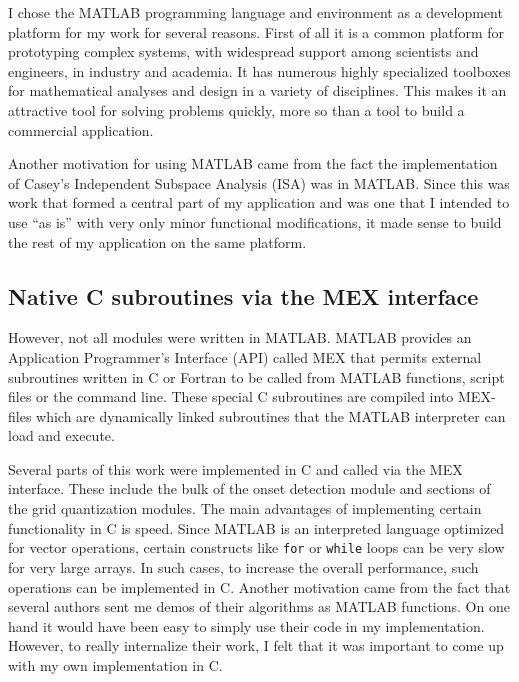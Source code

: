 I chose the MATLAB{\texttrademark} programming language and 
environment as a development platform for my work for several reasons.
First of all it is a common platform for prototyping complex systems,
with widespread support among scientists and engineers, in industry
and academia. It has numerous highly specialized toolboxes for 
mathematical analyses and design in a variety of disciplines. 
This makes it an attractive tool for solving problems quickly, 
more so than a tool to build a commercial application.

Another motivation for using MATLAB{\texttrademark} came from the fact
the implementation of Casey's Independent Subspace Analysis
(ISA) was in MATLAB{\texttrademark}.  Since this was work that formed a 
central part of my application and was one that I intended to use ``as is'' 
with very only minor functional modifications, it made sense to build 
the rest of my application on the same platform.

\vspace{5mm}
\subsection{Native C subroutines via the MEX interface}

However, not all modules were written in MATLAB{\texttrademark}. 
MATLAB{\texttrademark} provides an Application Programmer's 
Interface (API) called MEX that permits external subroutines written in 
C or Fortran to be called from MATLAB{\texttrademark} functions, 
script files or the command line. These special C subroutines are
compiled into MEX-files which are dynamically linked subroutines 
that the MATLAB{\texttrademark} interpreter can load and execute.

Several parts of this work were implemented in C and called via
the MEX interface. These include the bulk of the onset detection 
module and sections of the grid quantization modules.
The main advantages of implementing certain functionality in C is 
speed.  Since MATLAB{\texttrademark} is an interpreted language optimized for 
vector operations, certain constructs like \texttt{for} or \texttt{while} 
loops can be very slow for very large arrays. In such cases, to
increase the overall performance, such operations can be implemented
in C. Another motivation came from the fact that several authors 
sent me demos of their algorithms as MATLAB{\texttrademark}
functions. On one hand it would have been easy to simply use their
code in my implementation. However, to really internalize their work,
I felt that it was important to come up with my own implementation in C.



